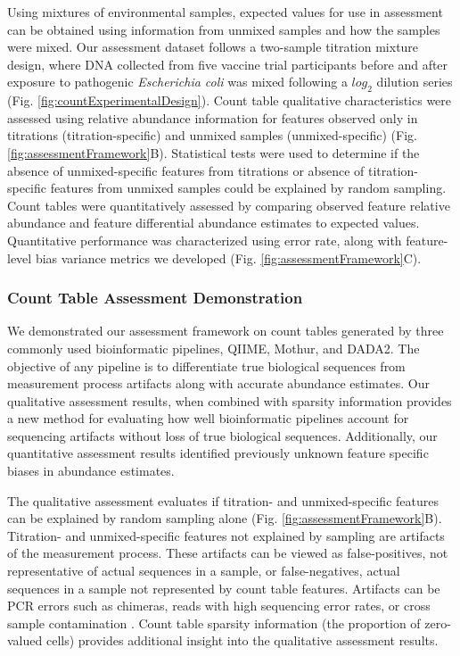 \documentclass[linenumbers]{bmcart}
\begin{document}
Using mixtures of environmental samples, expected values for use in assessment
can be obtained using information from unmixed samples and how the samples were mixed.
Our assessment dataset follows a two-sample titration mixture design, where DNA collected from five vaccine trial participants before and
after exposure to pathogenic \emph{Escherichia coli}  was mixed following a \(log_2\) dilution
series (Fig. \ref{fig:countExperimentalDesign}).
Count table qualitative characteristics were assessed using relative abundance information for
features observed only in titrations (titration-specific) and unmixed samples (unmixed-specific) (Fig. \ref{fig:assessmentFramework}B).
Statistical tests were used to determine if the absence of unmixed-specific features from titrations or absence of titration-specific features from unmixed samples could be explained by random sampling.
Count tables were quantitatively assessed by comparing observed feature relative abundance and feature differential abundance estimates to expected values.
Quantitative performance was characterized using error rate, along with feature-level bias variance metrics we developed (Fig. \ref{fig:assessmentFramework}C).


\subsubsection*{Count Table Assessment Demonstration}
We demonstrated our assessment framework on count tables generated by three commonly used bioinformatic pipelines, QIIME, Mothur, and DADA2.
The objective of any pipeline is to differentiate true biological sequences from measurement process artifacts along with accurate abundance estimates.
Our qualitative assessment results, when combined with sparsity information provides a
new method for evaluating how well bioinformatic pipelines account for sequencing artifacts without loss of true biological sequences.
Additionally, our quantitative assessment results identified previously unknown feature specific biases in abundance estimates.

The qualitative assessment evaluates if titration- and unmixed-specific features can be explained by random sampling alone (Fig. \ref{fig:assessmentFramework}B).
Titration- and unmixed-specific features not explained by sampling are artifacts of the measurement process.
These artifacts can be viewed as false-positives, not representative of actual sequences in a sample,
or false-negatives, actual sequences in a sample not represented by count table features. 
Artifacts can be PCR errors such as chimeras, reads with high sequencing error rates, or cross sample contamination \cite{edgar2011uchime}\cite{Edgar2018-ss}\cite{damore2016}. 
Count table sparsity information (the proportion of zero-valued cells) provides
additional insight into the qualitative assessment results.
\end{document}
